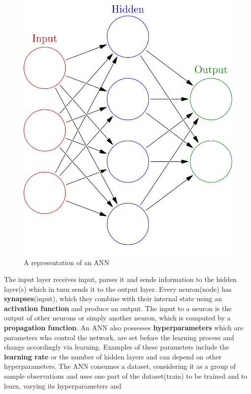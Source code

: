 \documentclass{scrartcl}
\begin{document}
    \begin{figure}[h!]
        \centering
        \includegraphics[scale=0.2]{ann.png}
        \caption{A representation of an ANN}
    \end{figure}
    The input layer receives input, parses it and sends information to the hidden layer(s) which
    in turn sends it to the output layer. Every neuron(node) has \textbf{synapses}(input), 
    which they combine with their internal state using an \textbf{activation function} and produce
    an output. The input to a neuron is the output of other neurons or simply another neuron,
    which is computed by a \textbf{propagation function}.
    An ANN also possesses \textbf{hyperparameters} which are parameters who control the network,
    are set before the learning process and change accordingly via learning. Examples of these 
    parameters include the \textbf{learning rate} or the number of hidden layers and can depend
    on other hyperparameters. \newline
    The ANN consumes a dataset, considering it as a group of sample observations and uses one 
    part of  the dataset(train) to be trained and to learn, varying its hyperparameters and 
\end{document}
